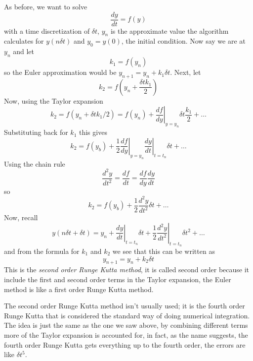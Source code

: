 \documentclass[12pt]{article}
\begin{document}
As before, we want to solve
\begin{equation}
\frac{dy}{dt}=f(y)
\end{equation}
with a time discretization of $\delta t$, $y_n$ is the approximate
value the algorithm calculates for $y(n\delta t)$ and $y_0=y(0)$, the
initial condition. Now say we are at $y_n$ and let
\begin{equation}
k_1=f(y_n)
\end{equation}
so the Euler approximation would be $y_{n+1}=y_n+k_1\delta t$. Next, let
\begin{equation}
k_2=f\left(y_n+\frac{\delta t k_1}{2}\right)
\end{equation}
Now, using the Taylor expansion
\begin{equation}
k_2=f(y_n+\delta t k_1/2)=f(y_n)+\left.\frac{df}{dy}\right|_{y=y_n}\delta t\frac{k_1}{2}+\ldots
\end{equation}
Substituting back for $k_1$ this gives
\begin{equation}
k_2=f(y_b)+\frac{1}{2}\left.\frac{df}{dy}\right|_{y=y_n}\left.\frac{dy}{dt}\right|_{t=t_n}\delta t+\ldots
\end{equation}
Using the chain rule
\begin{equation}
\frac{d^2y}{dt^2}=\frac{df}{dt}=\frac{df}{dy}\frac{dy}{dt}
\end{equation}
so
\begin{equation}
k_2=f(y_b)+\frac{1}{2}\frac{d^2y}{dt^2}\delta t+\ldots
\end{equation}
Now, recall
\begin{equation}
y(n\delta t + \delta t)=y_n+\left.\frac{dy}{dt}\right|_{t=t_n}\delta t+\frac{1}{2}\left.\frac{d^2y}{dt^2}\right|_{t=t_n}\delta t^2+\ldots
\end{equation}
and from the formula for $k_1$ and $k_2$ we see that this can be written as
\begin{equation}
y_{n+1}=y_n+k_2\delta t
\end{equation}
This is the \textsl{second order Runge Kutta method}, it is called second order
because it include the first and second order terms in the Taylor
expansion, the Euler method is like a first order Runge Kutta method. 

The second order Runge Kutta method isn't usually used; it is the
fourth order Runge Kutta that is considered the standard way of doing
numerical integration. The idea is just the same as the one we saw
above, by combining different terms more of the Taylor expansion is
accounted for, in fact, as the name suggests, the fourth order Runge
Kutta gets everything up to the fourth order, the errors are like
$\delta t^5$.
\end{document}
